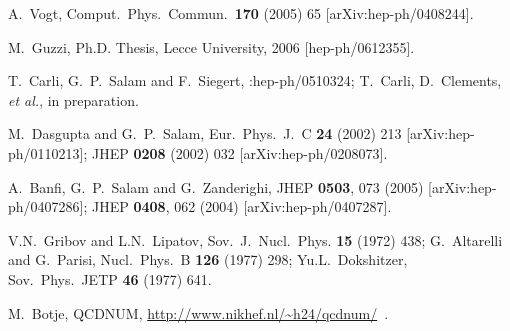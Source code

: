 \documentclass[12pt]{article}
\begin{document}
\begin{thebibliography}{99}
  A.~Vogt,
  Comput.\ Phys.\ Commun.\  {\bf 170} (2005) 65
  [arXiv:hep-ph/0408244].


  M.~Guzzi, Ph.D. Thesis, Lecce University, 2006 [hep-ph/0612355].

  T.~Carli, G.~P.~Salam and F.~Siegert,
  :hep-ph/0510324;
  T.~Carli, D.~Clements, {\it et al.}, in preparation.

  M.~Dasgupta and G.~P.~Salam,
  Eur.\ Phys.\ J.\  C {\bf 24} (2002) 213
  [arXiv:hep-ph/0110213];
  JHEP {\bf 0208} (2002) 032
  [arXiv:hep-ph/0208073].

  A.~Banfi, G.~P.~Salam and G.~Zanderighi,
  JHEP {\bf 0503}, 073 (2005)
  [arXiv:hep-ph/0407286];
%
  JHEP {\bf 0408}, 062 (2004)
  [arXiv:hep-ph/0407287].


V.N.~Gribov and L.N.~Lipatov, 
Sov.\ J.\ Nucl.\ Phys. {\bf 15} (1972) 438;
G.~Altarelli and G.~Parisi, 
Nucl.\ Phys.\ B {\bf 126} (1977) 298;
Yu.L.~Dokshitzer, 
Sov.\ Phys.\ JETP {\bf 46} (1977) 641.


  M.~Botje, QCDNUM, \url{http://www.nikhef.nl/~h24/qcdnum/}~.

\end{thebibliography}
\end{document}
